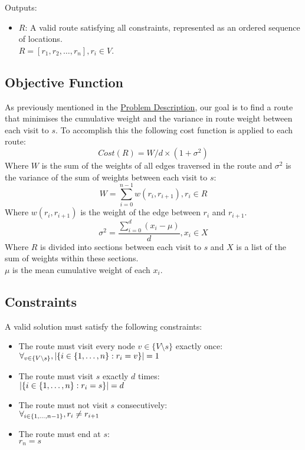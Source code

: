 Outputs:
\begin{itemize}
    \item $R$: A valid route satisfying all constraints, represented as an ordered sequence of locations.\\
    $R = [r_1, r_2, \dots, r_n], r_i \in V$.
\end{itemize}

\subsection{Objective Function}\label{subsec:objective-function}
As previously mentioned in the \hyperref[subsec:problem-description]{Problem Description}, our goal is to find a
route that minimises the cumulative weight and the variance in route weight between each visit to $s$.
To accomplish this the following cost function is applied to each route:
\begin{equation}
    Cost(R) = W/d \times (1 + \sigma^2)\label{eq:cost}
\end{equation}
Where $W$ is the sum of the weights of all edges traversed in the route and $\sigma^2$ is the variance of the
sum of weights between each visit to $s$:
\begin{equation}
    W = \sum_{i=0}^{n-1} w(r_i, r_{i+1}), r_i \in R\label{eq:weight}
\end{equation}
Where $w(r_i, r_{i+1})$ is the weight of the edge between $r_i$ and $r_{i+1}$.
\begin{equation}
    \sigma^2 = \frac{\sum_{i=0}^{d}(x_i-\mu)}{d}, x_i \in X\label{eq:standard-deviation}
\end{equation}
Where $R$ is divided into sections between each visit to $s$ and $X$ is a list of the sum of weights within these
sections.\\
$\mu$ is the mean cumulative weight of each $x_i$.

\subsection{Constraints}\label{subsec:problem-constraints}
A valid solution must satisfy the following constraints:
\begin{itemize}
    \item The route must visit every node $v \in \{V \setminus s\}$ exactly once:\\
    $\forall_{v \in \{V \setminus s\}}, |\{i \in \{1, \mathellipsis, n\}: r_i = v\}| = 1$
    \item The route must visit $s$ exactly $d$ times:\\
    $|\{i \in \{1, \mathellipsis, n\}: r_i = s\}| = d$
    \item The route must not visit $s$ consecutively:\\
    $\forall_{i \in \{1, \mathellipsis, n-1\}}, r_i \neq r_{i+1}$
    \item The route must end at $s$:\\
    $r_n = s$
\end{itemize}
